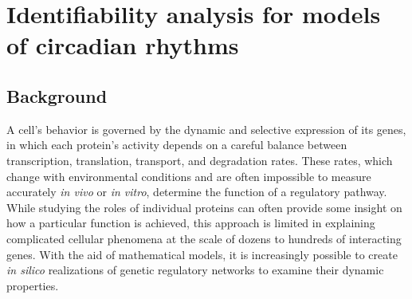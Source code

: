 
\chapter{Identifiability analysis for models of circadian rhythms}
\section{Background}
A cell's behavior is governed by the dynamic and selective expression of its
genes, in which each protein's activity depends on a careful balance between
transcription, translation, transport, and degradation rates. These rates, which
change with environmental conditions and are often impossible to measure
accurately {\itshape in vivo} or {\itshape in vitro}, determine the function of
a regulatory pathway. While studying the roles of individual proteins can often
provide some insight on how a particular function is achieved, this approach is
limited in explaining complicated cellular phenomena at the scale of dozens to
hundreds of interacting genes. With the aid of mathematical models, it is
increasingly possible to create {\itshape in silico} realizations of genetic
regulatory networks to examine their dynamic properties.

